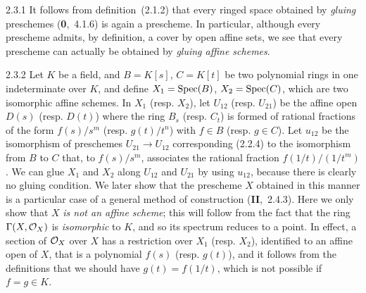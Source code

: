 \documentclass[../main.tex]{subfiles}
\begin{document}
\begin{cx}{2.3.1}
    It follows from definition~(2.1.2) that every ringed space obtained by \emph{gluing} preschemes (\textbf{0},~4.1.6) is again a prescheme.
    In particular, although every prescheme admits, by definition, a cover by open affine sets, we see that every prescheme can actually be obtained by \emph{gluing affine schemes}.
\end{cx}

\begin{cx}[Example]{2.3.2}
    Let $K$ be a field, and $B=K[s]$, $C=K[t]$ be two polynomial rings in one indeterminate over $K$, and define $X_1=\operatorname*{Spec}(B)$, $X_2=\operatorname*{Spec}(C)$, which are two isomorphic affine schemes.
    In $X_1$ (resp. $X_2$), let $U_{12}$ (resp. $U_{21}$) be the affine open $D(s)$ (resp. $D(t)$) where the ring $B_s$ (resp. $C_t$) is formed of rational fractions of the form $f(s)/s^m$ (resp. $g(t)/t^n$) with $f\in B$ (resp. $g\in C$).
    Let $u_{12}$ be the isomorphism of preschemes $U_{21}\to U_{12}$ corresponding (2.2.4) to the isomorphism from $B$ to $C$ that, to $f(s)/s^m$, associates the rational fraction $f(1/t)/(1/t^m)$.
    We can glue $X_1$ and $X_2$ along $U_{12}$ and $U_{21}$ by using $u_{12}$, because there is clearly no gluing condition.
    We later show that the prescheme $X$ obtained in this manner is a particular case of a general method of construction (\textbf{II},~2.4.3).
    Here we only show that $X$ \emph{is not an affine scheme}; this will follow from the fact that the ring $\Gamma(X,\mathcal{O}_X)$ is \emph{isomorphic} to $K$, and so its spectrum reduces to a point.
    In effect, a section of $\mathcal{O}_X$ over $X$ has a restriction over $X_1$ (resp. $X_2$), identified to an affine open of $X$, that is a polynomial $f(s)$ (resp. $g(t)$), and it follows from the definitions that we should have $g(t)=f(1/t)$, which is not possible if $f=g\in K$.
\end{cx}
\end{document}

